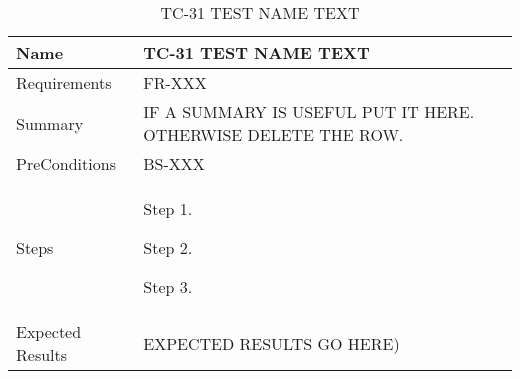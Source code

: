 \begin{table}[htbp!]
\centering
      \begin{tabular}{|p{1.05 in} |p{4.75 in} |}
      \hline
         \rowcolor[rgb]{0.8,0.8,0.8} Name & TC-31 TEST NAME TEXT\\
         \hline
         Requirements & FR-XXX\\  \hline
         Summary & IF A SUMMARY IS USEFUL PUT IT HERE.  OTHERWISE DELETE THE ROW.\\  \hline
         PreConditions & BS-XXX\\     \hline
         Steps &
         \begin{compactenum}
             \item Step 1.
             \item Step 2.
             \item Step 3.
         \end{compactenum}
         \\ \hline
         Expected Results & EXPECTED RESULTS GO HERE)\\
      \hline
      \end{tabular}
      \label{Table:TC-31}
      \caption{TC-31 TEST NAME TEXT}
\end{table} 